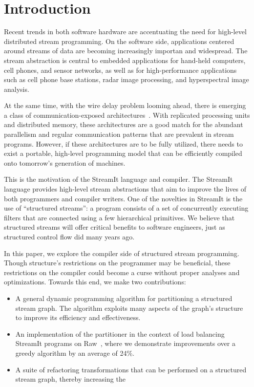 \section{Introduction}

Recent trends in both software hardware are accentuating the need for
high-level distributed stream programming.  On the software side,
applications centered around streams of data are becoming increasingly
importan and widespread.  The stream abstraction is central to
embedded applications for hand-held computers, cell phones, and sensor
networks, as well as for high-performance applications such as cell
phone base stations, radar image processing, and hyperspectral image
analysis.  

At the same time, with the wire delay problem looming ahead, there is
emerging a class of communication-exposed
architectures~\cite{raw-micro,trips,smartmemories}.  With replicated
processing units and distributed memory, these architectures are a
good match for the abundant parallelism and regular communication
patterns that are prevalent in stream programs.  However, if these
architectures are to be fully utilized, there needs to exist a
portable, high-level programming model that can be efficiently
compiled onto tomorrow's generation of machines.

This is the motivation of the StreamIt language and compiler.  The
StreamIt language provides high-level stream abstractions that aim to
improve the lives of both programmers and compiler writers.  One of
the novelties in StreamIt is the use of ``structured streams'': a
program consists of a set of concurrently executing filters that are
connected using a few hierarchical primitives.  We believe that
structured streams will offer critical benefits to software engineers,
just as structured control flow did many years ago.

In this paper, we explore the compiler side of structured stream
programming.  Though structure's restrictions on the programmer may be
beneficial, these restrictions on the compiler could become a curse
without proper analyses and optimizations.  Towards this end, we make
two contributions:
\begin{itemize}

\item A general dynamic programming algorithm for partitioning a
structured stream graph.  The algorithm exploits many aspects of the
graph's structure to improve its efficiency and effectiveness.

\item An implementation of the partitioner in the context of load
balancing StreamIt programs on Raw~\cite{raw-micro}, where we
demonstrate improvements over a greedy algorithm by an average of
24\%.

\item A suite of refactoring transformations that can be performed on
a structured stream graph, thereby  increasing the 

\end{itemize}


